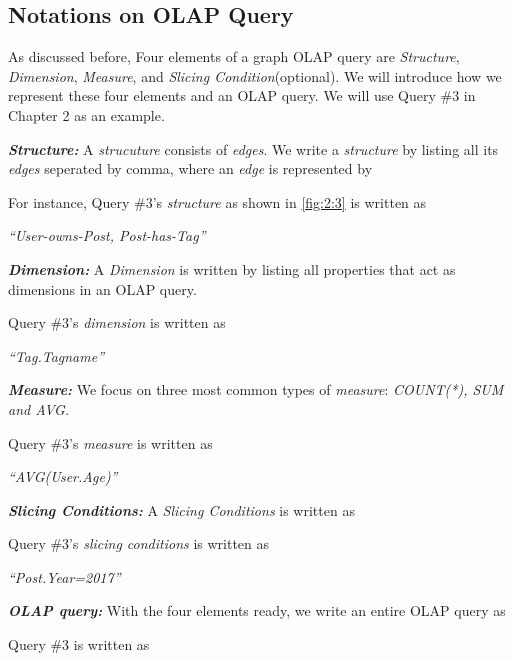 \subsection{Notations on OLAP Query}

As discussed before, Four elements of a graph OLAP query are \textit{Structure}, \textit{Dimension}, \textit{Measure}, and \textit{Slicing Condition}(optional). We will introduce how we represent these four elements and an OLAP query. We will use Query \#3 in Chapter 2 as an example.

\textbf{\textit{Structure:}} A \textit{strucuture} consists of \textit{edges}. We write a \textit{structure} by listing all its \textit{edges} seperated by comma, where an \textit{edge} is represented by 


For instance, Query \#3's \textit{structure} as shown in \ref{fig:2:3} is written as 

\textit{``User-owns-Post, Post-has-Tag''}



\textbf{\textit{Dimension:}} A
\textit{Dimension} is written by listing all properties that act as dimensions in an OLAP query.

Query \#3's \textit{dimension} is written as

\textit{``Tag.Tagname''}

\textbf{\textit{Measure:}} We focus on three most common types of \textit{measure}: \textit{COUNT(*), SUM and AVG. }

Query \#3's \textit{measure} is written as

\textit{``AVG(User.Age)''}


\textbf{\textit{Slicing Conditions:}} A \textit{Slicing Conditions} is written as 


Query \#3's \textit{slicing conditions} is written as

\textit{``Post.Year=2017''}

\textbf{\textit{OLAP query:}} With the four elements ready, we write an entire OLAP query as 


Query \#3 is written as 

